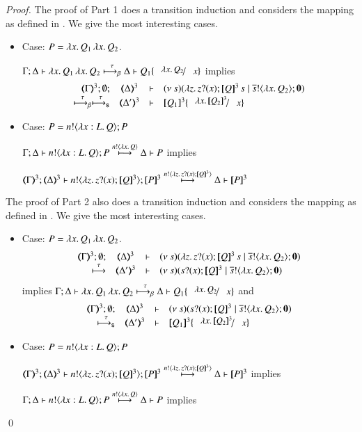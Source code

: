 \begin{proof}
	The proof of Part 1 does a transition induction and
	considers the mapping as defined in .
	We give the most interesting cases.

	\begin{itemize}
		\item	Case: $P = \lambda x.\,Q_1\,\lambda x.\,Q_2$.

			$\horel{\Gamma}{\Delta}{\appl{\abs{x}{Q_1}}{\abs{x}{Q_2}}}{\bhby{\tau}}{\Delta}{Q_1 \subst{\abs{x}{Q_2}}{x}}$ implies
\[
			\mhorel{\tmap{\Gamma}{3}}{\tmap{\Delta}{3}}{ \newsp{s}{ \appl{\abs{z}\binp{z}{x} \pmap{Q}{3}}{s}  \Par \bout{\dual{s}}{\abs{x}{Q_2}} \inact}}{\bhby{\tau} \shby{\tau}}
			{\tmap{\Delta'}{3}}{}{\pmap{Q_1}{3} \subst{\abs{x}{\pmap{Q_2}{3}}}{x}}
\]

		\item	Case: $P = n ! \langle \lambda x:L.\,Q \rangle ; P$

			$\Gamma; \Delta \vdash n ! \langle \lambda x:L.\,Q \rangle ; P \stackrel{ n ! \langle \lambda x.\,Q \rangle}{\longmapsto} \Delta \vdash P$ implies

			$\horel{\tmap{\Gamma}{3}}{\tmap{\Delta}{3}}{\bout{n}{\abs{z} \binp{z}{x} \pmap{Q}{3}} \pmap{P}{3}}{\hby{ \bactout{n}{\abs{z}{\binp{z}{x} \pmap{Q}{3}} } }}{\Delta}{\pmap{P}{3}}$
	\end{itemize}

	The proof of Part 2 also does a transition induction and
	considers the mapping as defined in .
	We give the most interesting cases.

	\begin{itemize}
		\item	Case: $P = \lambda x.\,Q_1\,\lambda x.\,Q_2$.
%
		\[
			\mhorel{\tmap{\Gamma}{3}}{\tmap{\Delta}{3}}{\newsp{s}{ \appl{\abs{z}\binp{z}{x} \pmap{Q}{3}}{s}  \Par \bout{\dual{s}}{\abs{x}{Q_2}} \inact}}{\hby{\tau}}
			{\tmap{\Delta'}{3}}{}{\newsp{s}{\binp{s}{x} \pmap{Q}{3}  \Par \bout{\dual{s}}{\abs{x}{Q_2}} \inact}}
		\]
%
			\noi implies
			$\horel{\Gamma}{\Delta}{\appl{\abs{x}{Q_1}}{\abs{x}{Q_2}}}{\bhby{\tau}}{\Delta}{Q_1 \subst{\abs{x}{Q_2}}{x}}$ and
%
		\[
			\mhorel{\tmap{\Gamma}{3}}{\tmap{\Delta}{3}}{\newsp{s}{\binp{s}{x} \pmap{Q}{3}  \Par \bout{\dual{s}}{\abs{x}{Q_2}} \inact}}{\shby{\tau}}
			{\tmap{\Delta'}{3}}{}{\pmap{Q_1}{3} \subst{\abs{x}{\pmap{Q_2}{3}}}{x}}
		\]

		\item	Case: $P = n ! \langle \lambda x:L.\,Q \rangle ; P$

			$\horel{\tmap{\Gamma}{3}}{\tmap{\Delta}{3}}{\bout{n}{\abs{z} \binp{z}{x} \pmap{Q}{3}} \pmap{P}{3}}{\hby{ \bactout{n}{\abs{z}{\binp{z}{x} \pmap{Q}{3}} } }}{\Delta}{\pmap{P}{3}}$ implies

			$\Gamma; \Delta \vdash n ! \langle \lambda x:L.\,Q \rangle ; P \stackrel{ n ! \langle \lambda x.\,Q \rangle}{\longmapsto} \Delta \vdash P$ implies
	\end{itemize}
	\qed
\end{proof}

